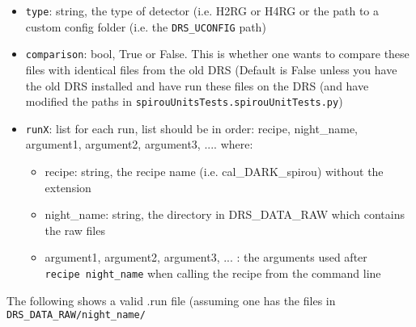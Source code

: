 \documentclass[11pt]{article}
\providecommand{\tightlist}{%
      \setlength{\itemsep}{0pt}\setlength{\parskip}{0pt}}
\begin{document}
\begin{itemize}
\tightlist
\item
  \texttt{type}: string, the type of detector (i.e. H2RG or H4RG or the
  path to a custom config folder (i.e. the \texttt{DRS\_UCONFIG} path)
\item
  \texttt{comparison}: bool, True or False. This is whether one wants to
  compare these files with identical files from the old DRS (Default is
  False unless you have the old DRS installed and have run these files
  on the DRS (and have modified the paths in
  \texttt{spirouUnitsTests.spirouUnitTests.py})
\item
  \texttt{runX}: list for each run, list should be in order: recipe,
  night\_name, argument1, argument2, argument3, .... where:

  \begin{itemize}
  \tightlist
  \item
    recipe: string, the recipe name (i.e. cal\_DARK\_spirou) without the
    extension
  \item
    night\_name: string, the directory in DRS\_DATA\_RAW which contains
    the raw files
  \item
    argument1, argument2, argument3, ... : the arguments used after
    \texttt{recipe\ night\_name} when calling the recipe from the
    command line
  \end{itemize}
\end{itemize}

The following shows a valid .run file (assuming one has the files in
\texttt{DRS\_DATA\_RAW/night\_name/}
\end{document}
